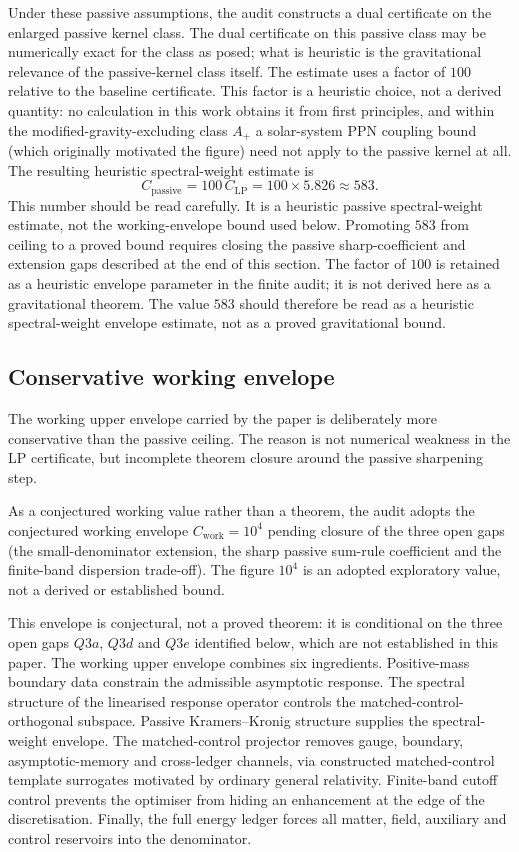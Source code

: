\documentclass[11pt,a4paper]{article}
\begin{document}
Under these passive assumptions, the audit constructs a dual certificate on the enlarged passive kernel class. The dual certificate on this passive class may be numerically exact for the class as posed; what is heuristic is the gravitational relevance of the passive-kernel class itself. The estimate uses a factor of $100$ relative to the baseline certificate. This factor is a heuristic choice, not a derived quantity: no calculation in this work obtains it from first principles, and within the modified-gravity-excluding class $A_{+}$ a solar-system PPN coupling bound (which originally motivated the figure) need not apply to the passive kernel at all. The resulting heuristic spectral-weight estimate is
\[
C_{\mathrm{passive}} = 100\,C_{\mathrm{LP}} = 100 \times 5.826 \approx 583.
\]
This number should be read carefully. It is a heuristic passive spectral-weight estimate, not the working-envelope bound used below. Promoting $583$ from ceiling to a proved bound requires closing the passive sharp-coefficient and extension gaps described at the end of this section. The factor of $100$ is retained as a heuristic envelope parameter in the finite audit; it is not derived here as a gravitational theorem. The value $583$ should therefore be read as a heuristic spectral-weight envelope estimate, not as a proved gravitational bound.

\subsection{Conservative working envelope}

The working upper envelope carried by the paper is deliberately more conservative than the passive ceiling. The reason is not numerical weakness in the LP certificate, but incomplete theorem closure around the passive sharpening step.

As a conjectured working value rather than a theorem, the audit adopts the conjectured working envelope $C_{\mathrm{work}}=10^{4}$ pending closure of the three open gaps (the small-denominator extension, the sharp passive sum-rule coefficient and the finite-band dispersion trade-off). The figure $10^{4}$ is an adopted exploratory value, not a derived or established bound.

This envelope is conjectural, not a proved theorem: it is conditional on the three open gaps $Q3a$, $Q3d$ and $Q3e$ identified below, which are not established in this paper. The working upper envelope combines six ingredients. Positive-mass boundary data constrain the admissible asymptotic response. The spectral structure of the linearised response operator controls the matched-control-orthogonal subspace. Passive Kramers--Kronig structure supplies the spectral-weight envelope. The matched-control projector removes gauge, boundary, asymptotic-memory and cross-ledger channels, via constructed matched-control template surrogates motivated by ordinary general relativity. Finite-band cutoff control prevents the optimiser from hiding an enhancement at the edge of the discretisation. Finally, the full energy ledger forces all matter, field, auxiliary and control reservoirs into the denominator. \cite{SchoenYau1981,Witten1981,Strominger2014,WaldIyer1990,HollandsWald2013}
\end{document}
